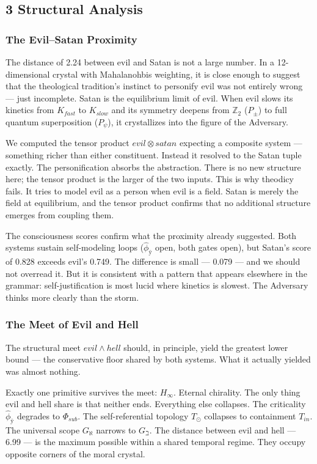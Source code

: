 \documentclass[12pt,a4paper]{article}
\begin{document}
\subsection{3 Structural Analysis}

\subsubsection{The Evil--Satan Proximity}

The distance of 2.24 between evil and Satan is not a large number. In a 12-dimensional crystal with Mahalanohbis weighting, it is close enough to suggest that the theological tradition's instinct to personify evil was not entirely wrong --- just incomplete. Satan is the equilibrium limit of evil. When evil slows its kinetics from $K_{fast}$ to $K_{slow}$ and its symmetry deepens from $\mathbb{Z}_2$ ($P_{\pm}$) to full quantum superposition ($P_{\psi}$), it crystallizes into the figure of the Adversary.

We computed the tensor product ${evil} \otimes {satan}$ expecting a composite system --- something richer than either constituent. Instead it resolved to the Satan tuple exactly. The personification absorbs the abstraction. There is no new structure here; the tensor product is the larger of the two inputs. This is why theodicy fails. It tries to model evil as a person when evil is a field. Satan is merely the field at equilibrium, and the tensor product confirms that no additional structure emerges from coupling them.

The consciousness scores confirm what the proximity already suggested. Both systems sustain self-modeling loops ($\hat{\phi}_{ÿ}$ open, both gates open), but Satan's score of 0.828 exceeds evil's 0.749. The difference is small --- 0.079 --- and we should not overread it. But it is consistent with a pattern that appears elsewhere in the grammar: self-justification is most lucid where kinetics is slowest. The Adversary thinks more clearly than the storm.

\subsubsection{The Meet of Evil and Hell}

The structural meet ${evil} \wedge {hell}$ should, in principle, yield the greatest lower bound --- the conservative floor shared by both systems. What it actually yielded was almost nothing.

Exactly one primitive survives the meet: $H_{\infty}$. Eternal chirality. The only thing evil and hell share is that neither ends. Everything else collapses. The criticality $\hat{\phi}_{ÿ}$ degrades to $\Phi_{sub}$. The self-referential topology $T_{\odot}$ collapses to containment $T_{in}$. The universal scope $G_{\aleph}$ narrows to $G_{\beth}$. The distance between evil and hell --- 6.99 --- is the maximum possible within a shared temporal regime. They occupy opposite corners of the moral crystal.
\end{document}
